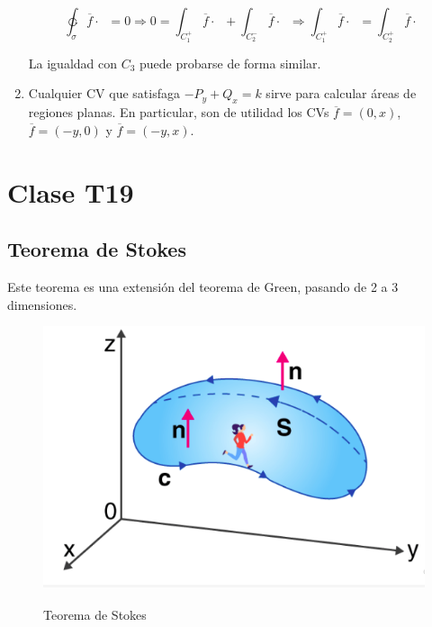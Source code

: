 \documentclass{article}
\begin{document}
\begin{enumerate}
\begin{equation}
\ointctrclockwise_{\sigma} \overline{f} \cdot \mathop{\overline{d\sigma}} = 0 \Rightarrow 0 = \int_{C_1^+} \overline{f} \cdot \mathop{\overline{dC_1}} + \int_{C_2^-} \overline{f} \cdot \mathop{\overline{dC_2}} \Rightarrow \int_{C_1^+} \overline{f} \cdot \mathop{\overline{dC_1}} = \int_{C_2^+} \overline{f} \cdot \mathop{\overline{dC_2}}
\end{equation}

La igualdad con $C_3$ puede probarse de forma similar.

\item Cualquier CV que satisfaga $-P_y + Q_x = k$ sirve para calcular áreas de regiones planas. En particular, son de utilidad los CVs $\overline{f} = (0, x)$, $\overline{f} = (-y, 0)$ y $\overline{f} = (-y, x)$.

\end{enumerate}

\section{Clase T19}

\subsection{Teorema de Stokes}

Este teorema es una extensión del teorema de Green, pasando de 2 a 3 dimensiones.

\begin{figure}[ht]
\centering
\caption{Teorema de Stokes}
\includegraphics[scale=0.5]{img/teo_fig033_stokes.png}
\label{fig:stokes}
\end{figure}
\end{document}
